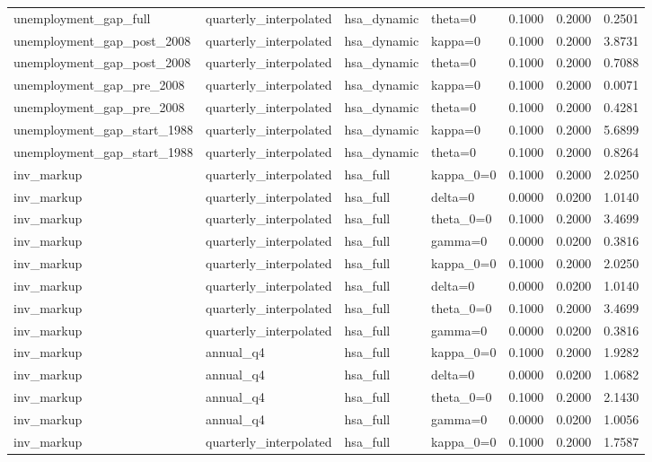 \begin{tabular}{llllrrr}
unemployment\_gap\_full & quarterly\_interpolated & hsa\_dynamic & theta=0 & 0.1000 & 0.2000 & 0.2501 \\
unemployment\_gap\_post\_2008 & quarterly\_interpolated & hsa\_dynamic & kappa=0 & 0.1000 & 0.2000 & 3.8731 \\
unemployment\_gap\_post\_2008 & quarterly\_interpolated & hsa\_dynamic & theta=0 & 0.1000 & 0.2000 & 0.7088 \\
unemployment\_gap\_pre\_2008 & quarterly\_interpolated & hsa\_dynamic & kappa=0 & 0.1000 & 0.2000 & 0.0071 \\
unemployment\_gap\_pre\_2008 & quarterly\_interpolated & hsa\_dynamic & theta=0 & 0.1000 & 0.2000 & 0.4281 \\
unemployment\_gap\_start\_1988 & quarterly\_interpolated & hsa\_dynamic & kappa=0 & 0.1000 & 0.2000 & 5.6899 \\
unemployment\_gap\_start\_1988 & quarterly\_interpolated & hsa\_dynamic & theta=0 & 0.1000 & 0.2000 & 0.8264 \\
inv\_markup & quarterly\_interpolated & hsa\_full & kappa\_0=0 & 0.1000 & 0.2000 & 2.0250 \\
inv\_markup & quarterly\_interpolated & hsa\_full & delta=0 & 0.0000 & 0.0200 & 1.0140 \\
inv\_markup & quarterly\_interpolated & hsa\_full & theta\_0=0 & 0.1000 & 0.2000 & 3.4699 \\
inv\_markup & quarterly\_interpolated & hsa\_full & gamma=0 & 0.0000 & 0.0200 & 0.3816 \\
inv\_markup & quarterly\_interpolated & hsa\_full & kappa\_0=0 & 0.1000 & 0.2000 & 2.0250 \\
inv\_markup & quarterly\_interpolated & hsa\_full & delta=0 & 0.0000 & 0.0200 & 1.0140 \\
inv\_markup & quarterly\_interpolated & hsa\_full & theta\_0=0 & 0.1000 & 0.2000 & 3.4699 \\
inv\_markup & quarterly\_interpolated & hsa\_full & gamma=0 & 0.0000 & 0.0200 & 0.3816 \\
inv\_markup & annual\_q4 & hsa\_full & kappa\_0=0 & 0.1000 & 0.2000 & 1.9282 \\
inv\_markup & annual\_q4 & hsa\_full & delta=0 & 0.0000 & 0.0200 & 1.0682 \\
inv\_markup & annual\_q4 & hsa\_full & theta\_0=0 & 0.1000 & 0.2000 & 2.1430 \\
inv\_markup & annual\_q4 & hsa\_full & gamma=0 & 0.0000 & 0.0200 & 1.0056 \\
inv\_markup & quarterly\_interpolated & hsa\_full & kappa\_0=0 & 0.1000 & 0.2000 & 1.7587 \\

\end{tabular}
